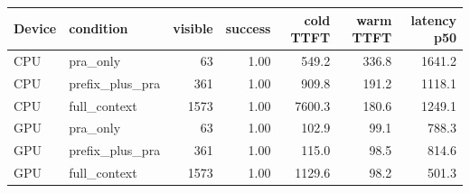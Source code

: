 \begin{tabular}{llrrrrr}\toprule
Device & condition & visible & success & cold TTFT & warm TTFT & latency p50\\\midrule
CPU & pra\_only & 63 & 1.00 & 549.2 & 336.8 & 1641.2 \\
CPU & prefix\_plus\_pra & 361 & 1.00 & 909.8 & 191.2 & 1118.1 \\
CPU & full\_context & 1573 & 1.00 & 7600.3 & 180.6 & 1249.1 \\
GPU & pra\_only & 63 & 1.00 & 102.9 & 99.1 & 788.3 \\
GPU & prefix\_plus\_pra & 361 & 1.00 & 115.0 & 98.5 & 814.6 \\
GPU & full\_context & 1573 & 1.00 & 1129.6 & 98.2 & 501.3 \\
\bottomrule\end{tabular}
